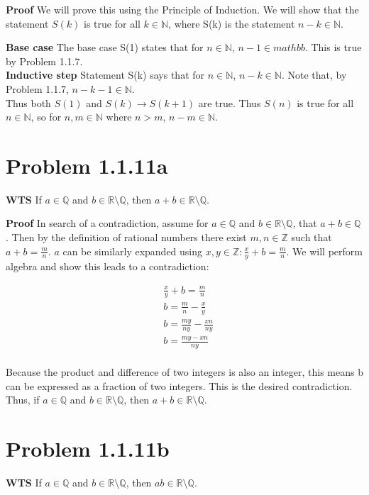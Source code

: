 \documentclass[10pt]{article} %
\begin{document}
\textbf{Proof} We will prove this using the Principle of Induction. We will show that the statement $S(k)$ is true for all $k\in\mathbb{N}$, where S(k) is the statement $n-k\in\mathbb{N}$.

\textbf{Base case} The base case S(1) states that for $n\in\mathbb{N}$, $n-1\in{mathbb}$. This is true by Problem 1.1.7.\\

\textbf{Inductive step} Statement S(k) says that for $n\in\mathbb{N}$, $n-k\in\mathbb{N}$. Note that, by Problem 1.1.7, $n-k-1\in\mathbb{N}$.\\

Thus both $S(1)$ and $S(k)\rightarrow S(k+1)$ are true. Thus $S(n)$ is true for all $n\in\mathbb{N}$, so for $n,m \in \mathbb{N}$ where $n > m$, $n-m \in \mathbb{N}$.\\

\section{Problem 1.1.11a}
\textbf{WTS} If $a \in \mathbb{Q}$ and $b \in \mathbb{R}\setminus \mathbb{Q}$, then $a+b \in \mathbb{R}\setminus \mathbb{Q}$.

\textbf{Proof} In search of a contradiction, assume for $a \in \mathbb{Q}$ and $b \in \mathbb{R}\setminus \mathbb{Q}$, that $a+b \in \mathbb{Q}$. Then by the definition of rational numbers there exist $m,n \in \mathbb{Z}$ such that $a+b = \frac{m}{n}$. $a$ can be similarly expanded using $x,y \in \mathbb{Z}: \frac{x}{y}+b = \frac{m}{n}$. We will perform algebra and show this leads to a contradiction:

\begin{align*}
  &\frac{x}{y}+b = \frac{m}{n}\\
  &b = \frac{m}{n} - \frac{x}{y}\\
  &b = \frac{my}{ny} - \frac{xn}{ny}\\
  &b = \frac{my-xn}{ny}\\
\end{align*}

Because the product and difference of two integers is also an integer, this means b can be expressed as a fraction of two integers. This is the desired contradiction. Thus, if $a \in \mathbb{Q}$ and $b \in \mathbb{R}\setminus \mathbb{Q}$, then $a+b \in \mathbb{R}\setminus \mathbb{Q}$.

\section{Problem 1.1.11b}
\textbf{WTS} If $a \in \mathbb{Q}$ and $b \in \mathbb{R}\setminus \mathbb{Q}$, then $ab \in \mathbb{R}\setminus \mathbb{Q}$.
\end{document}
